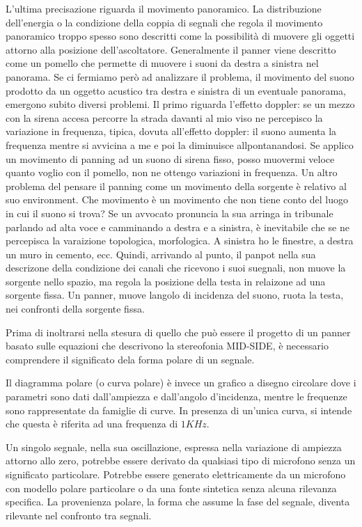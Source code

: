L'ultima precisazione riguarda il movimento panoramico. La distribuzione dell'energia
o la condizione della coppia di segnali che regola il movimento panoramico troppo
spesso sono descritti come la possibilità di muovere gli oggetti attorno alla posizione
dell'ascoltatore. Generalmente il panner viene descritto come un pomello che
permette di muovere i suoni da destra a sinistra nel panorama. Se ci fermiamo però ad analizzare il problema, il movimento del suono prodotto da un oggetto acustico tra destra e sinistra di un eventuale panorama, emergono subito diversi problemi. Il primo riguarda l'effetto doppler: se un mezzo con la sirena accesa percorre la strada davanti al mio viso ne percepisco la variazione in frequenza, tipica, dovuta all'effetto doppler: il suono aumenta la frequenza mentre si avvicina a me e poi la diminuisce allpontanandosi. Se applico un movimento di panning ad un suono di sirena fisso, posso muovermi veloce quanto voglio con il pomello, non ne ottengo variazioni in frequenza. Un altro problema del pensare il panning come un movimento della sorgente è relativo al suo environment. Che movimento è un movimento che non tiene conto del luogo in cui il suono si trova? Se un avvocato pronuncia la sua arringa in tribunale parlando ad alta voce e camminando a destra e a sinistra, è inevitabile che se ne percepisca la varaizione topologica, morfologica. A sinistra ho le finestre, a destra un muro in cemento, ecc.
Quindi, arrivando al punto, il panpot nella sua descrizone della condizione dei canali che ricevono i suoi suegnali, non muove la sorgente nello spazio, ma regola la posizione della testa in relaizone ad una sorgente fissa. Un panner, muove langolo di incidenza del suono, ruota la testa, nei confronti della sorgente fissa. 

Prima di inoltrarsi nella stesura di quello che può essere il progetto di un
panner basato sulle equazioni che descrivono la stereofonia MID-SIDE, è
necessario comprendere il significato dela forma polare di un segnale.

Il diagramma polare (o curva polare) è invece un grafico a disegno circolare
dove i parametri sono dati dall’ampiezza e dall’angolo d’incidenza, mentre le
frequenze sono rappresentate da famiglie di curve. In presenza di un’unica curva,
si intende che questa è riferita ad una frequenza di $1KHz$. %

Un singolo segnale, nella sua oscillazione, espressa nella variazione di ampiezza
attorno allo zero, potrebbe essere derivato da qualsiasi tipo di microfono senza
un significato particolare. Potrebbe essere generato elettricamente da un
microfono con modello polare particolare o da una fonte sintetica senza
alcuna rilevanza specifica. La provenienza polare, la forma che assume la fase
del segnale, diventa rilevante nel confronto tra segnali.

